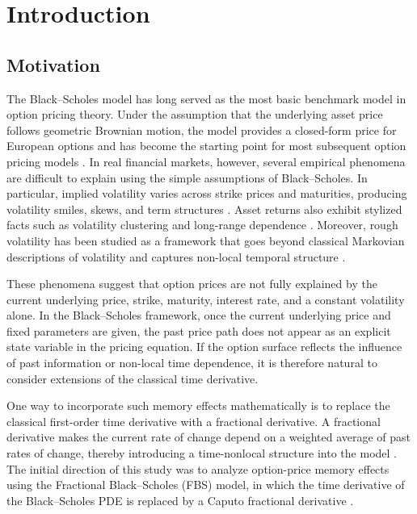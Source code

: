 \documentclass[11pt,a4paper]{report}
\begin{document}
\newpage
\tableofcontents

\chapter{Introduction}

\section{Motivation}

The Black--Scholes model has long served as the most basic benchmark model in option pricing theory. Under the assumption that the underlying asset price follows geometric Brownian motion, the model provides a closed-form price for European options and has become the starting point for most subsequent option pricing models \cite{BlackScholes1973,Merton1973}. In real financial markets, however, several empirical phenomena are difficult to explain using the simple assumptions of Black--Scholes. In particular, implied volatility varies across strike prices and maturities, producing volatility smiles, skews, and term structures \cite{Dupire1994,DumasFlemingWhaley1998,Gatheral2006}. Asset returns also exhibit stylized facts such as volatility clustering and long-range dependence \cite{Cont2001}. Moreover, rough volatility has been studied as a framework that goes beyond classical Markovian descriptions of volatility and captures non-local temporal structure \cite{GatheralJaissonRosenbaum2018}.

These phenomena suggest that option prices are not fully explained by the current underlying price, strike, maturity, interest rate, and a constant volatility alone. In the Black--Scholes framework, once the current underlying price and fixed parameters are given, the past price path does not appear as an explicit state variable in the pricing equation. If the option surface reflects the influence of past information or non-local time dependence, it is therefore natural to consider extensions of the classical time derivative.

One way to incorporate such memory effects mathematically is to replace the classical first-order time derivative with a fractional derivative. A fractional derivative makes the current rate of change depend on a weighted average of past rates of change, thereby introducing a time-nonlocal structure into the model \cite{Podlubny1999}. The initial direction of this study was to analyze option-price memory effects using the Fractional Black--Scholes (FBS) model, in which the time derivative of the Black--Scholes PDE is replaced by a Caputo fractional derivative \cite{Wyss2000, CarteaDelCastilloNegrete2007}.
\end{document}
